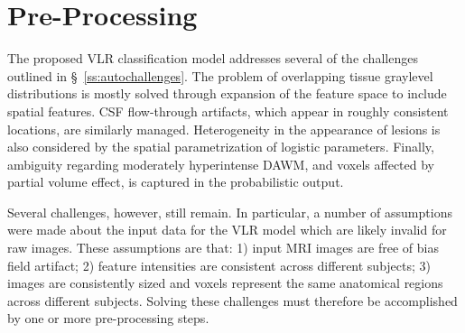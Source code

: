 \section{Pre-Processing}\label{s:meth-pre}
The proposed VLR classification model addresses several of the challenges outlined in \S\ \ref{ss:autochallenges}.
The problem of overlapping tissue graylevel distributions is mostly solved through expansion of the feature space to include spatial features.
CSF flow-through artifacts, which appear in roughly consistent locations, are similarly managed.
Heterogeneity in the appearance of lesions is also considered by the spatial parametrization of logistic parameters.
Finally, ambiguity regarding moderately hyperintense DAWM, and voxels affected by partial volume effect, is captured in the probabilistic output.
\par
Several challenges, however, still remain.
In particular, a number of assumptions were made about the input data for the VLR model which are likely invalid for raw images.
These assumptions are that:
1) input MRI images are free of bias field artifact;
2) feature intensities are consistent across different subjects;
3) images are consistently sized and voxels represent the same anatomical regions across different subjects.
Solving these challenges must therefore be accomplished by one or more pre-processing steps.
